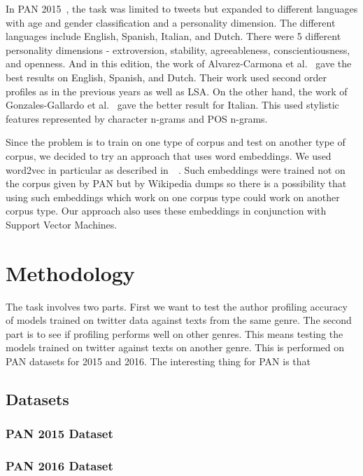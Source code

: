 \documentclass[conference]{IEEEtran}
\begin{document}
In PAN 2015~\cite{rangel2015overview}, the task was limited to tweets but expanded to different languages with age and gender classification and a personality dimension. The different languages include English, Spanish, Italian, and Dutch. There were 5 different personality dimensions - extroversion, stability, agreeableness, conscientiousness, and openness. And in this edition, the work of Alvarez-Carmona et al.~\cite{alvarezinaoe} gave the best results on English, Spanish, and Dutch. Their work used second order profiles as in the previous years as well as LSA. On the other hand, the work of Gonzales-Gallardo et al.~\cite{gonzaleztweets} gave the better result for Italian. This used stylistic features represented by character n-grams and POS n-grams.

Since the problem is to train on one type of corpus and test on another type of corpus, we decided to try an approach that uses word embeddings. We used word2vec in particular as described in~\cite{mikolov2013efficient}~\cite{mikolov2013distributed}. Such embeddings were trained not on the corpus given by PAN but by Wikipedia dumps so there is a possibility that using such embeddings which work on one corpus type could work on another corpus type. Our approach also uses these embeddings in conjunction with Support Vector Machines.
\section{Methodology}
The task involves two parts. First we want to test the author profiling accuracy of models trained on twitter data against texts from the same genre. The second part is to see if profiling performs well on other genres. This means testing the models trained on twitter against texts on another genre. This is performed on PAN datasets for 2015 and 2016. The interesting thing for PAN is that 

\subsection{Datasets}
\subsubsection{PAN 2015 Dataset}
\subsubsection{PAN 2016 Dataset}
\end{document}
